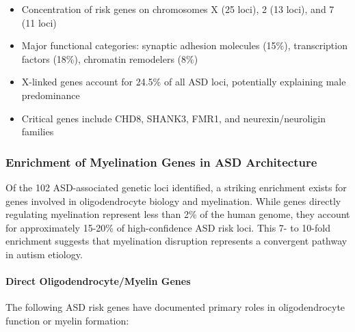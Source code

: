 \documentclass[12pt]{article}
\begin{document}
\begin{itemize}
\item Concentration of risk genes on chromosomes X (25 loci), 2 (13 loci), and 7 (11 loci)
\item Major functional categories: synaptic adhesion molecules (15\%), transcription factors (18\%), chromatin remodelers (8\%)
\item X-linked genes account for 24.5\% of all ASD loci, potentially explaining male predominance
\item Critical genes include CHD8, SHANK3, FMR1, and neurexin/neuroligin families
\end{itemize}

\subsubsection{Enrichment of Myelination Genes in ASD Architecture}

Of the 102 ASD-associated genetic loci identified, a striking enrichment exists for genes involved in oligodendrocyte biology and myelination. While genes directly regulating myelination represent less than 2\% of the human genome, they account for approximately 15-20\% of high-confidence ASD risk loci. This 7- to 10-fold enrichment suggests that myelination disruption represents a convergent pathway in autism etiology.

\paragraph{Direct Oligodendrocyte/Myelin Genes}
The following ASD risk genes have documented primary roles in oligodendrocyte function or myelin formation:
\end{document}
